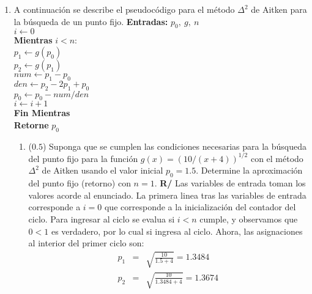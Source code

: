 \documentclass[12pt]{article}
\begin{document}
\vspace{-.5cm}
  \begin{enumerate}[leftmargin=*,widest=9]
    \item A continuación se describe el pseudocódigo para el método \(\Delta^2\) de Aitken para la búsqueda de un punto fijo.
    \small{
    \textbf{Entradas:} \(p_0, \ g, \ n\)\\
    \(i \gets 0\)\\
    \textbf{Mientras} \(i < n\):\\
    \hspace*{.5 cm} \(p_1 \gets g(p_0)\)\\
    \hspace*{.5 cm} \(p_2 \gets g(p_1)\)\\
    \hspace*{.5 cm} \(num \gets p_{1} - p_0\)\\
    \hspace*{.5 cm} \(den \gets p_{2} - 2p_{1} + p_0\)\\
    \hspace*{.5 cm} \(p_0 \gets p_0 - num / den \)\\
    \hspace*{.5 cm} \(i \gets i + 1\)\\
    \textbf{Fin Mientras}\\
    \textbf{Retorne} \(p_0\)
    }
    \begin{enumerate}[label=\alph*]
    \item (\(0.5\)) Suponga que se cumplen las condiciones necesarias para la búsqueda del punto fijo para la función \(g(x) = {(10/(x+4))}^{1/2}\)
    con el método \(\Delta^2\) de Aitken usando el valor inicial \(p_0=1.5\). Determine la aproximación del punto fijo (retorno) con \(n=1\).
\textbf{R/} Las variables de entrada toman los valores acorde al enunciado. La primera linea tras las variables de entrada corresponde a \(i=0\) que corresponde a la inicialización del contador del ciclo. Para ingresar al ciclo se evalua si \(i<n\) cumple, y observamos que \(0 < 1\) es verdadero, por lo cual si ingresa al ciclo. Ahora, las asignaciones al interior del primer ciclo son:
\begin{eqnarray*}
p_1 &=& \sqrt{\frac{10}{1.5 + 4}} = 1.3484 \\
p_2 &=& \sqrt{\frac{10}{1.3484 + 4}} = 1.3674 \\

\end{eqnarray*}
\end{enumerate}
\end{enumerate}
\end{document}
